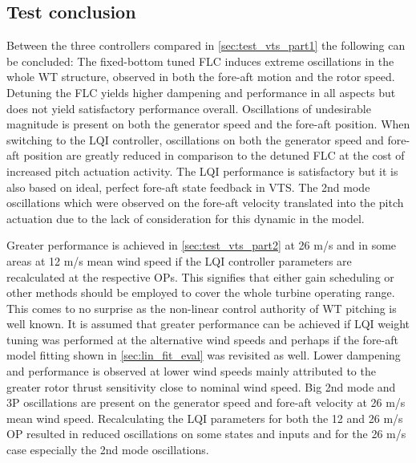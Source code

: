 \clearpage
\newpage
\subsection{Test conclusion}
Between the three controllers compared in \cref{sec:test_vts_part1} the following can be concluded: The fixed-bottom tuned FLC induces extreme oscillations in the whole WT structure, observed in both the fore-aft motion and the rotor speed. Detuning the FLC yields higher dampening and performance in all aspects but does not yield satisfactory performance overall. Oscillations of undesirable magnitude is present on both the generator speed and the fore-aft position. When switching to the LQI controller, oscillations on both the generator speed and fore-aft position are greatly reduced in comparison to the detuned FLC at the cost of increased pitch actuation activity. The LQI performance is satisfactory but it is also based on ideal, perfect fore-aft state feedback in VTS. The 2nd mode oscillations which were observed on the fore-aft velocity translated into the pitch actuation due to the lack of consideration for this dynamic in the model.

Greater performance is achieved in \cref{sec:test_vts_part2} at 26 m/s and in some areas at 12 m/s mean wind speed if the LQI controller parameters are recalculated at the respective OPs. This signifies that either gain scheduling or other methods should be employed to cover the whole turbine operating range. This comes to no surprise as the non-linear control authority of WT pitching is well known. It is assumed that greater performance can be achieved if LQI weight tuning was performed at the alternative wind speeds and perhaps if the fore-aft model fitting shown in \cref{sec:lin_fit_eval} was revisited as well. Lower dampening and performance is observed at lower wind speeds mainly attributed to the greater rotor thrust sensitivity close to nominal wind speed. Big 2nd mode and 3P oscillations are present on the generator speed and fore-aft velocity at 26 m/s mean wind speed. Recalculating the LQI parameters for both the 12 and 26 m/s OP resulted in reduced oscillations on some states and inputs and for the 26 m/s case especially the 2nd mode oscillations.
